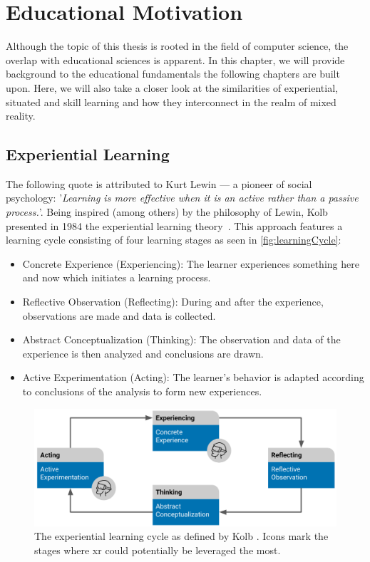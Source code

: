 %
\chapter{Educational Motivation \label{chap:concepts}}
Although the topic of this thesis is rooted in the field of computer science, the overlap with educational sciences is apparent. In this chapter, we will provide background to the educational fundamentals the following chapters are built upon. Here, we will also take a closer look at the similarities of experiential, situated and skill learning and how they interconnect in the realm of mixed reality.


\section{Experiential Learning \label{sec:experiential}}
The following quote is attributed to Kurt Lewin --- a pioneer of social psychology: '\emph{Learning is more effective when it is an active rather than a passive process.}'.
Being inspired (among others) by the philosophy of Lewin, Kolb presented in 1984 the experiential learning theory~\cite{kolb:1984:experiential}.
This approach features a learning cycle consisting of four learning stages as seen in \autoref{fig:learningCycle}:

\begin{itemize}
    \setlength{\itemsep}{-0.3cm}
    \item Concrete Experience (Experiencing): The learner experiences something here and now which initiates a learning process.
    \item Reflective Observation (Reflecting): During and after the experience, observations are made and data is collected.
    \item Abstract Conceptualization (Thinking): The observation and data of the experience is then analyzed and conclusions are drawn.
    \item Active Experimentation (Acting): The learner's behavior is adapted according to conclusions of the analysis to form new experiences. 
\end{itemize}

\begin{figure}[h!bt]
	\centering
	\includegraphics[width=0.9\linewidth]{pictures/ExperientialLearningCycle2.png}
	\captionsetup{labelfont=bf,textfont=it}
	\caption[The experiential learning cycle as defined by Kolb \cite{kolb:1984:experiential}.]{The experiential learning cycle as defined by Kolb \cite{kolb:1984:experiential}. Icons mark the stages where \acrshort{xr} could potentially be leveraged the most.\label{fig:learningCycle}}
\end{figure}

